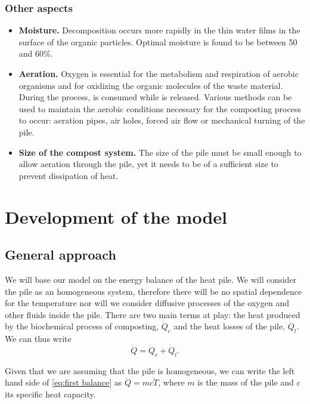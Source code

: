 \documentclass[12pt, a4paper, twocolumn, twoside]{article}
\numberwithin{table}{section}
\numberwithin{figure}{section}
\numberwithin{equation}{section}
\begin{document}
\subsubsection{Other aspects}
\begin{itemize}
	\item \textbf{Moisture.} Decomposition occurs more rapidly in the thin water films in the surface of the organic particles. Optimal moisture is found to be between 50 and 60\%.
	\item  \textbf{Aeration.} Oxygen is essential for the metabolism and respiration of aerobic organisms and for oxidizing the organic molecules of the waste material. During the process,  is consumed while  is released. Various methods can be used to maintain the aerobic conditions necessary for the composting process to occur: aeration pipes, air holes, forced air flow or mechanical turning of the pile.
	\item  \textbf{Size of the compost system.} The size of the pile must be small enough to allow aeration through the pile, yet it needs to be of a sufficient size to prevent dissipation of heat.
	\end{itemize}

\section{Development of the model}
\subsection{General approach}
We will base our model on the energy balance of the heat pile. We will consider the pile as an homogeneous system, therefore there will be no spatial dependence for the temperature nor will we consider diffusive processes of the oxygen and other fluids inside the pile. There are two main terms at play: the heat produced by the biochemical process of composting, \( \dot{Q}_c \) and the heat losses of the pile, \( \dot{Q}_l \). We can thus write
\begin{equation} \label{eq:first balance}
	\dot{Q} = \dot{Q}_c + \dot{Q}_l. 
\end{equation}

Given that we are assuming that the pile is homogeneous, we can write the left hand side of \cref{eq:first balance} as \( \dot{Q} = mc\dot{T} \), where \( m \) is the mass of the pile and \( c \) its specific heat capacity. 
\end{document}
